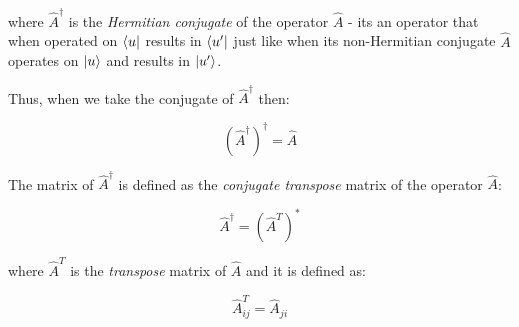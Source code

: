 where $\hat{A}^\dag$ is the \textit{Hermitian conjugate} of the operator $\hat{A}$ - its an operator
that when operated on $\bra{u}$ results in $\bra{u'}$ just like when its non-Hermitian conjugate
$\hat{A}$ operates on $\ket{u}$ and results in $\ket{u'}$.

Thus, when we take the conjugate of $\hat{A}^\dag$ then:

\begin{equation}
    (\hat{A}^\dag)^\dag=\hat{A}
\end{equation}

The matrix of $\hat{A}^\dag$ is defined as the \textit{conjugate transpose} matrix of the operator $\hat{A}$:

\begin{equation}
    \hat{A}^\dag=(\hat{A}^T)^*
\end{equation}

where $\hat{A}^T$ is the \textit{transpose} matrix of $\hat{A}$ and it is defined as:

\begin{equation}
    \hat{A}_{ij}^T=\hat{A}_{ji}
\end{equation}